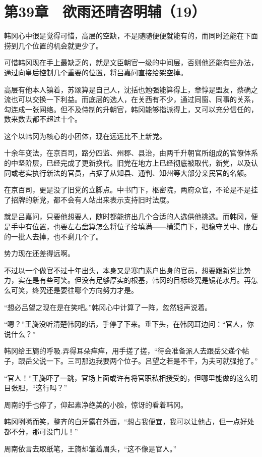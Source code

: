 \section{第39章　欲雨还晴咨明辅（19）}

韩冈心中很是觉得可惜，高层的空缺，不是随随便便就能有的，而同时还能在下面捞到几个位置的机会就更少了。

可惜韩冈现在手上最缺乏的，就是文臣朝官一级的中间层，否则他还能有些办法，通过向皇后控制几个重要的位置，将吕嘉问直接给架空掉。

高层有他本人镇着，苏颂算是自己人，沈括也勉强能算得上，章惇是盟友，蔡确之流也可以交换一下利益。而底层的选人，在关西有不少，通过同窗、同事的关系，勾连成一张网络。但不及侍制的升朝官，韩冈能够指派得上，又可以充分信任的，数来数去都不超过十个。

这个以韩冈为核心的小团体，现在远远比不上新党。

十余年变法，在京百司，路分四监、州郡、县治，由两千升朝官所组成的官僚体系的中坚阶层，已经完成了更新换代。旧党在地方上已经彻底被取代，新党，以及认同或老实执行新法的官员，占据了从知县、通判、知州等大部分亲民官的名额。

在京百司，更是没了旧党的立脚点。中书门下，枢密院，两府众官，不论是不是挂了招牌的新党，都不会有人站出来表示支持旧时法度。

就是吕嘉问，只要他想要人，随时都能挤出几个合适的人选供他挑选。而韩冈，便是手中有位置，也要左右盘算怎么将位子给填满——横渠门下，把稳守关中、陇右的一批人去掉，也不剩几个了。

势力现在还差得远啊。

不过以一个做官不过十年出头，本身又是寒门素户出身的官员，想要跟新党比势力，实在是有些可笑。但没有足够厚实的根基，韩冈的目标终究是镜花水月。再怎么可笑，终究还是要往哪个方向努力才是。

“想必吕望之现在是在笑吧。”韩冈心中计算了一阵，忽然轻声说着。

“嗯？”王旖没听清楚韩冈的话，手停了下来。垂下头，在韩冈耳边问：“官人，你说什么？”

韩冈给王旖的呼吸.弄得耳朵痒痒，用手搓了搓，“待会准备派人去跟岳父递个帖子，跟岳父说一下。三司那边我要两个位子。吕望之若是不干，为夫可就强抢了。”

“官人！”王旖吓了一跳，官场上面或许有将官职私相授受的，但哪里能做的这么明目张胆，“这行吗？”

周南的手也停了，仰起素净绝美的小脸，惊讶的看着韩冈。

韩冈咧嘴而笑，整齐的白牙露在外面，“想占我便宜，我可以让他占，但一点好处都不分，那可没门儿！”

周南依言去取纸笔，王旖却皱着眉头，“这不像是官人。”

